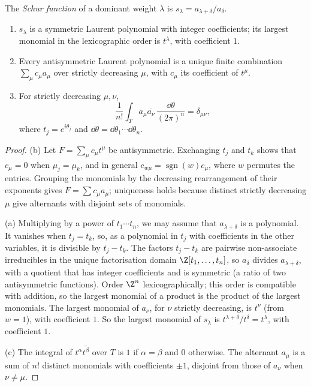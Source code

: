 \begin{definition}\label{def:schurpoly}
The \emph{Schur function} of a dominant weight $\lambda$ is $s_\lambda=a_{\lambda+\delta}/a_\delta$.
\end{definition}

\begin{lemma}\label{lem:alternants}
\begin{enumerate}[label=(\alph*)]
\item $s_\lambda$ is a symmetric Laurent polynomial with integer coefficients; its largest monomial in the lexicographic order is $t^\lambda$, with coefficient $1$.
\item Every antisymmetric Laurent polynomial is a unique finite combination $\sum_\mu c_\mu a_\mu$ over strictly decreasing $\mu$, with $c_\mu$ its coefficient of $t^\mu$.
\item For strictly decreasing $\mu,\nu$,
\[
\frac1{n!}\int_T a_\mu\overline{a_\nu}\,\frac{\dd\theta}{(2\pi)^n}=\delta_{\mu\nu},
\]
where $t_j=e^{i\theta_j}$ and $\dd\theta=\dd\theta_1\cdots\dd\theta_n$.
\end{enumerate}
\end{lemma}

\begin{proof}
(b) Let $F=\sum_\mu c_\mu t^\mu$ be antisymmetric. Exchanging $t_j$ and $t_k$ shows that $c_\mu=0$ when $\mu_j=\mu_k$, and in general $c_{w\mu}=\operatorname{sgn}(w)c_\mu$, where $w$ permutes the entries. Grouping the monomials by the decreasing
rearrangement of their exponents gives $F=\sum c_\mu a_\mu$; uniqueness holds because distinct strictly decreasing $\mu$ give alternants with disjoint sets of monomials.

(a) Multiplying by a power of $t_1\cdots t_n$, we may assume that $a_{\lambda+\delta}$ is a polynomial. It vanishes when $t_j=t_k$, so, as a polynomial in $t_j$ with coefficients in the other variables, it is divisible by $t_j-t_k$. The factors $t_j-t_k$ are pairwise
non-associate irreducibles in the unique factorisation domain $\Z[t_1,\dots,t_n]$, so $a_\delta$ divides $a_{\lambda+\delta}$, with a quotient that has integer coefficients and is symmetric (a ratio of two antisymmetric functions). Order $\Z^n$ lexicographically; this
order is compatible with addition, so the largest monomial of a product is the product of the largest monomials. The largest monomial of $a_\nu$, for $\nu$ strictly decreasing, is $t^\nu$ (from $w=1$), with coefficient $1$. So the largest monomial of $s_\lambda$
is $t^{\lambda+\delta}/t^\delta=t^\lambda$, with coefficient $1$.

(c) The integral of $t^\alpha\overline{t^\beta}$ over $T$ is $1$ if $\alpha=\beta$ and $0$ otherwise. The alternant $a_\mu$ is a sum of $n!$ distinct monomials with coefficients $\pm1$, disjoint from those of $a_\nu$ when $\nu\ne\mu$.
\end{proof}

